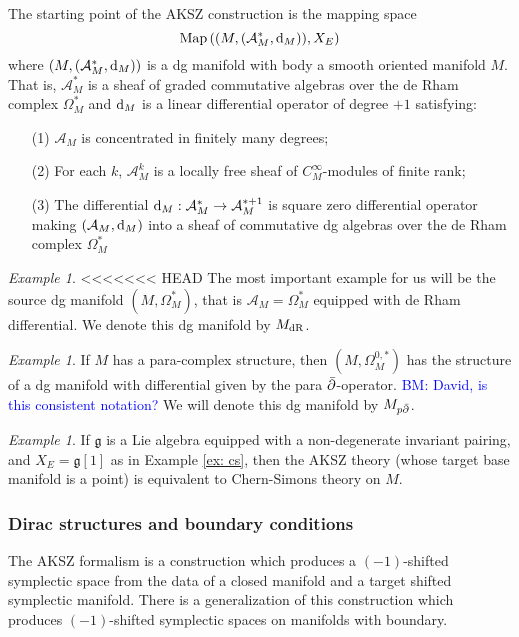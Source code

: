 \documentclass{article}
\def\fg{\mathfrak{g}}
\theoremstyle{definition}
\theoremstyle{remark}
\newtheorem{Ex}[theorem]{Example}
\def\brian{\textcolor{blue}{BM: }\textcolor{blue}}
\begin{document}
\def\sA{\mathcal{A}}
\def\d{{\rm d}}
\def\dbar{\Bar{\partial}}

The starting point of the AKSZ construction is the mapping space
\[
{\rm Map}\left((M, (\sA^*_M, \d_M)), X_E\right)
\]
where $(M, (\sA^*_M, \d_M))$ is a dg manifold with body a smooth oriented manifold $M$. 
That is, $\sA^*_M$ is a sheaf of graded commutative algebras over the de Rham complex $\Omega^*_M$ and $\d_M$ is a linear differential operator of degree $+1$ satisfying:
\begin{itemize}
\item[(1)] $\sA_M$ is concentrated in finitely many degrees;
\item[(2)] For each $k$, $\sA^k_M$ is a locally free sheaf of $C^\infty_M$-modules of finite rank;
\item[(3)] The differential $\d_M : \sA_M^* \to \sA_M^{*+1}$ is square zero differential operator making $(\sA_M , \d_M)$ into a sheaf of commutative dg algebras over the de Rham complex $\Omega^*_M$
\end{itemize}

\begin{Ex}
<<<<<<< HEAD
The most important example for us will be the source dg manifold $(M, \Omega^*_M)$, that is $\sA_M = \Omega^*_M$ equipped with de Rham differential. 
We denote this dg manifold by $M_{\rm dR}$.
\end{Ex}

\begin{Ex}
If $M$ has a para-complex structure, then $(M, \Omega^{0,*}_M)$ has the structure of a dg manifold with differential given by the para $\dbar$-operator. 
\brian{David, is this consistent notation?}
We will denote this dg manifold by $M_{p \dbar}$. 
\end{Ex}

\begin{Ex}
If $\fg$ is a Lie algebra equipped with a non-degenerate invariant pairing, and $X_E = \fg[1]$ as in Example \ref{ex: cs}, then the AKSZ theory (whose target base manifold is a point) is equivalent to Chern-Simons theory on $M$. 
\end{Ex}

\subsubsection{Dirac structures and boundary conditions}

The AKSZ formalism is a construction which produces a $(-1)$-shifted symplectic space from the data of a closed manifold and a target shifted symplectic manifold. 
There is a generalization of this construction which produces $(-1)$-shifted symplectic spaces on manifolds with boundary. 
\end{document}
